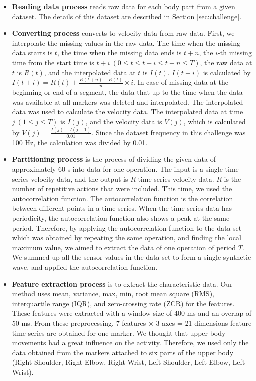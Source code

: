\documentclass[graybox]{svmult}
\begin{document}
\begin{itemize}
    \item {\bf Reading data process} reads raw data for each body part from a given dataset. The details of this dataset are described in Section \ref{sec:challenge}.

    \item {\bf Converting process} converts to velocity data from raw data. First, we interpolate the missing values in the raw data. The time when the missing data starts is $t$, the time when the missing data ends is $t+n$, the $i$-th missing time from the start time is $t+i ~(0\leq t \leq t+i \leq t+n \leq T)$, the raw data at $t$ is $R(t)$, and the interpolated data at $t$ is $I(t)$. $I(t+i)$ is calculated by $I(t+i)=R(t) + \frac{R(t+n)-R(t)}{n}\times i$. In case of missing data at the beginning or end of a segment, the data that up to the time when the data was available at all markers was deleted and interpolated. The interpolated data was used to calculate the velocity data. The interpolated data at time $j~(1\leq j\leq T)$ is $I(j)$, and the velocity data is $V(j)$, which is calculated by $V(j)=\frac{I(j)-I(j-1)}{0.01}$. Since the dataset frequency in this challenge was 100 Hz, the calculation was divided by 0.01.
    
    \item {\bf Partitioning process} is the process of dividing the given data of approximately 60 s into data for one operation. The input is a single time-series velocity data, and the output is $R$ time-series velocity data. $R$ is the number of repetitive actions that were included. This time, we used the autocorrelation function. The autocorrelation function is the correlation between different points in a time series. When the time series data has periodicity, the autocorrelation function also shows a peak at the same period. Therefore, by applying the autocorrelation function to the data set which was obtained by repeating the same operation, and finding the local maximum value, we aimed to extract the data of one operation of period $T$. We summed up all the sensor values in the data set to form a single synthetic wave, and applied the autocorrelation function.
    
    \item {\bf Feature extraction process} is to extract the characteristic data. Our method uses mean, variance, max, min, root mean square (RMS), interquartile range (IQR), and zero-crossing rate (ZCR) for the features. These features were extracted with a window size of 400 ms and an overlap of 50 ms. From these preprocessing, 7 features $\times$ 3 axes = 21 dimensions feature time series are obtained for one marker. We thought that upper body movements had a great influence on the activity. Therefore, we used only the data obtained from the markers attached to six parts of the upper body (Right Shoulder, Right Elbow, Right Wrist, Left Shoulder, Left Elbow, Left Wrist).
\end{itemize}
\end{document}
